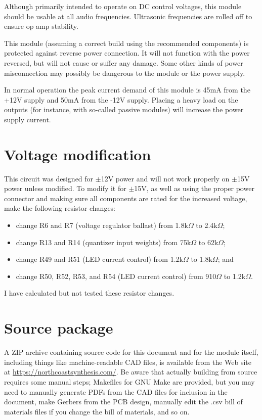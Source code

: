 Although primarily intended to operate on DC control voltages, this module
should be usable at all audio frequencies.  Ultrasonic frequencies are
rolled off to ensure op amp stability.

This module (assuming a correct build using the recommended components) is
protected against reverse power connection.  It will not function with the
power reversed, but will not cause or suffer any damage.  Some other kinds
of power misconnection may possibly be dangerous to the module or the power
supply.

In normal operation the peak current demand of this module is 45mA from the
+12V supply and 50mA from the -12V supply.  Placing a heavy
load on the outputs (for instance, with so-called passive modules) will
increase the power supply current.

\section{Voltage modification}

This circuit was designed for $\pm$12V power and will not work properly on
$\pm$15V power unless modified.  To modify it for $\pm$15V, as well as using
the proper power connector and making sure all components are rated for the
increased voltage, make the following resistor changes:
\begin{itemize}
  \item change R6 and R7 (voltage regulator ballast) from 1.8k$\Omega$ to
    2.4k$\Omega$;
  \item change R13 and R14 (quantizer input weights) from 75k$\Omega$ to
    62k$\Omega$;
  \item change R49 and R51 (LED current control) from 1.2k$\Omega$ to
    1.8k$\Omega$; and
  \item change R50, R52, R53, and R54 (LED current control) from
    910$\Omega$ to 1.2k$\Omega$.
\end{itemize}
I have calculated but not tested these resistor changes.

\section{Source package}

A ZIP archive containing source code for this document and for the module
itself, including things like machine-readable CAD files, is available from 
the Web site at 
\url{https://northcoastsynthesis.com/}.  Be aware that actually building
from source requires some manual steps; Makefiles for GNU Make are provided,
but you may need to manually generate PDFs from the CAD files for inclusion
in the document, make Gerbers from the PCB design, manually edit the .csv
bill of materials files if you change the bill of materials, and so on.

